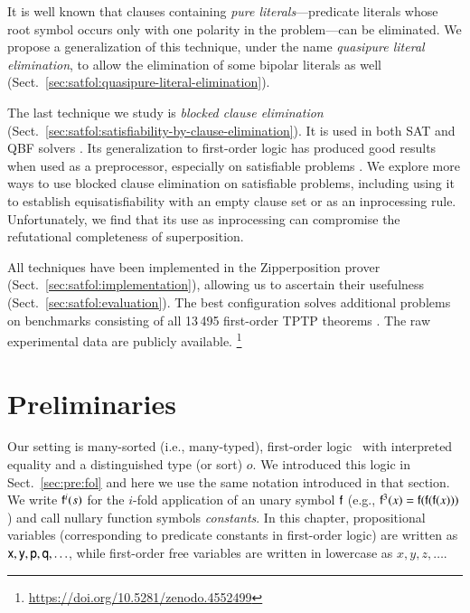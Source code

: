 \begin{qle}
It is well known that clauses containing \emph{pure literals}---predicate
literals whose root symbol occurs only with one polarity in the problem---can
be eliminated. We propose a generalization of this technique, under the name
\emph{quasipure literal elimination}, to allow the elimination of some bipolar
literals as well (Sect.~\ref{sec:satfol:quasipure-literal-elimination}).
\end{qle}

The last technique we study is \emph{blocked clause elimination} (Sect.\
\ref{sec:satfol:satisfiability-by-clause-elimination}). It is used in both SAT
\cite{jbh-10-BCE} and QBF solvers \cite{bls-11-bloqqer}. Its generalization to first-order
logic has produced good results when used as a preprocessor, especially on
satisfiable problems \cite{ksstb-2017-blockedfol}. We explore more ways to use
blocked clause elimination on satisfiable problems, including using it to
establish equisatisfiability with an empty clause set or as an inprocessing
rule. Unfortunately, we find that its use as inprocessing can compromise the
refutational completeness of superposition.


All techniques have been implemented in the Zipperposition prover
(Sect.~\ref{sec:satfol:implementation}), allowing us to ascertain their usefulness
(Sect.~\ref{sec:satfol:evaluation}). The best configuration solves \NumberOK{160}
additional problems on benchmarks consisting of all 13\,495 first-order TPTP theorems
\cite{gs-17-tptp}. The raw experimental data are publicly available.%
\footnote{\url{https://doi.org/10.5281/zenodo.4552499}}

\section{Preliminaries}
\label{sec:satfol:preliminaries}

Our setting is many-sorted (i.e., many-typed), first-order
logic~\cite{jg-1987-logic-textbook} with interpreted equality and a
distinguished type (or sort) $o$. We introduced this logic in
Sect.~\ref{sec:pre:fol} and here we use the same notation introduced in that section.
We write $\mathsf{f}^i(s)$ for the $i$-fold application of an unary symbol
$\mathsf{f}$ (e.g., $\mathsf{f}^3(x) = \mathsf{f}(\mathsf{f}(\mathsf{f}(x)))$) and call nullary
function symbols \emph{constants}. In this chapter, propositional variables
(corresponding to predicate constants in first-order logic) are written as
$\mathsf{x}, \mathsf{y}, \mathsf{p}, \mathsf{q}, \ldots$, while first-order free variables
are written in lowercase as $x,y,z,\ldots$.

